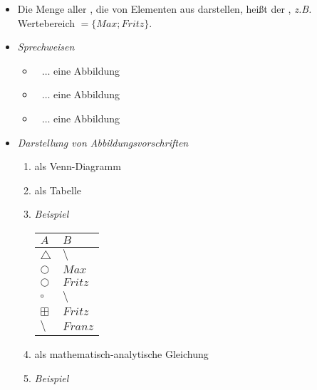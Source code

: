 \begin{itemize}[leftmargin=*]
                    \item[] Die Menge aller , die  von Elementen aus  darstellen, heißt  der , \textit{z.B.} Wertebereich $= \{Max; Fritz\}$.
                    \item[] \textit{Sprechweisen}
                        \begin{itemize}
                            \item[] \glqq \ $~\ldots$ eine Abbildung  \grqq 
                            \item[] \glqq \ $~\ldots$ eine Abbildung  \grqq 
                            \item[] \glqq \ $~\ldots$ eine Abbildung  \grqq  
                        \end{itemize}
                    \item[] \textit{Darstellung von Abbildungsvorschriften}
                        \begin{enumerate}
                            \item als Venn-Diagramm
                            \item als Tabelle
                            \item[] \textit{Beispiel} \\
                                \begin{tabular}{P{3cm}|P{3cm}}
                                    $A$             & $B$           \\\hline
                                    $\triangle$     & $\setminus$   \\
                                    $\bigcirc$      & $Max$         \\
                                    $\bigcirc$      & $Fritz$       \\
                                    $\square$       & $\setminus$   \\
                                    $\boxplus$      & $Fritz$       \\
                                    $\setminus$     & $Franz$       \\
                                \end{tabular}
                            \item als mathematisch-analytische Gleichung 
                            \item[] \textit{Beispiel} \\

\end{enumerate}
\end{itemize}
